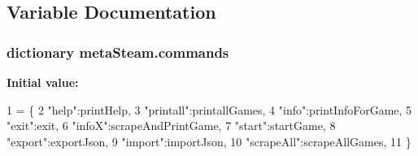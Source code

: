 \subsection{Variable Documentation}
\hypertarget{namespacemeta_steam_a05799bd182d0bf8b0e97b1e36b1e4ed4}{
\subsubsection[{commands}]{\setlength{\rightskip}{0pt plus 5cm}dictionary meta\+Steam.\+commands}}\label{namespacemeta_steam_a05799bd182d0bf8b0e97b1e36b1e4ed4}
{\bfseries Initial value\+:}
\begin{DoxyCode}
1 = \{
2     \textcolor{stringliteral}{"help"}:printHelp,
3     \textcolor{stringliteral}{"printall"}:printallGames,
4     \textcolor{stringliteral}{"info"}:printInfoForGame,
5     \textcolor{stringliteral}{"exit"}:exit,
6     \textcolor{stringliteral}{"infoX"}:scrapeAndPrintGame,
7     \textcolor{stringliteral}{"start"}:startGame,
8     \textcolor{stringliteral}{"export"}:exportJson,
9     \textcolor{stringliteral}{"import"}:importJson,
10     \textcolor{stringliteral}{"scrapeAll"}:scrapeAllGames,
11 \}
\end{DoxyCode}
